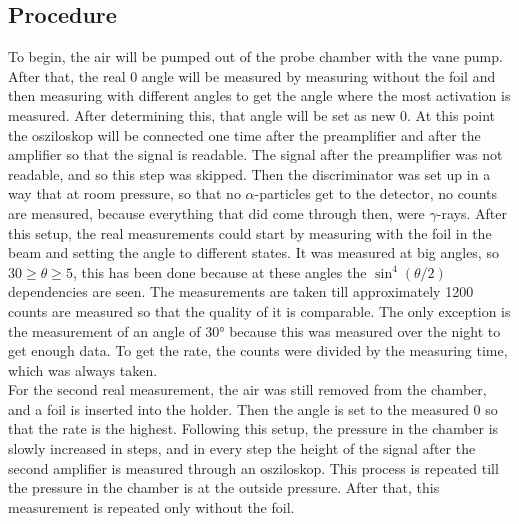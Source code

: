 \subsection{Procedure}

To begin, the air will be pumped out of the probe chamber with the vane pump. 
After that, the real 0 angle will be measured by measuring without the foil and then measuring with different angles to get the angle where the most activation is measured. 
After determining this, that angle will be set as new 0. 
At this point the osziloskop will be connected one time after the preamplifier and after the amplifier so that the signal is readable. 
The signal after the preamplifier was not readable, and so this step was skipped. 
Then the discriminator was set up in a way that at room pressure, so that no $\alpha$-particles get to the detector, no counts are measured, 
because everything that did come through then, were $\gamma$-rays.
After this setup, the real measurements could start by measuring with the foil in the beam and setting the angle to different states. 
It was measured at big angles, so $30 \ge \theta \ge 5$, this has been done because at these angles the $\sin^4(\theta/2)$ dependencies are seen. 
The measurements are taken till approximately 1200 counts are measured so that the quality of it is comparable. 
The only exception is the measurement of an angle of $30°$ because this was measured over the night to get enough data. 
To get the rate, the counts were divided by the measuring time, which was always taken. 
\\
For the second real measurement, the air was still removed from the chamber, and a foil is inserted into the holder. 
Then the angle is set to the measured 0 so that the rate is the highest. 
Following this setup, the pressure in the chamber is slowly increased in steps, and in every step the height of the signal after the second amplifier is measured through an 
osziloskop. 
This process is repeated till the pressure in the chamber is at the outside pressure. 
After that, this measurement is repeated only without the foil. 

\clearpage